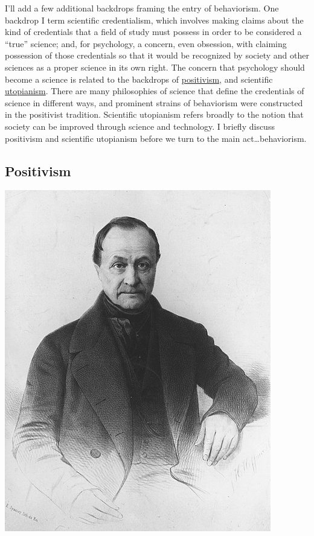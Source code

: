 \documentclass[
  oneside,
  12pt]{crumpbook}
\newenvironment{floatright25}{%
  \wrapfigure{R}{.25\textwidth}%
  }{%
  \endwrapfigure}
\begin{document}
I'll add a few additional backdrops framing the entry of behaviorism.
One backdrop I term scientific credentialism, which involves making claims about the kind of credentials that a field of study must possess in order to be considered a ``true'' science; and, for psychology, a concern, even obsession, with claiming possession of those credentials so that it would be recognized by society and other sciences as a proper science in its own right. The concern that psychology should become a science is related to the backdrops of \href{https://en.wikipedia.org/wiki/Positivism}{positivism}, and scientific \href{https://en.wikipedia.org/wiki/Utopia\#Utopianism}{utopianism}. There are many philosophies of science that define the credentials of science in different ways, and prominent strains of behaviorism were constructed in the positivist tradition. Scientific utopianism refers broadly to the notion that society can be improved through science and technology. I briefly discuss positivism and scientific utopianism before we turn to the main act\ldots behaviorism.

\hypertarget{positivism}{%
\subsection{Positivism}\label{positivism}}

\begin{floatright25}
\includegraphics[width=1\linewidth]{imgs/Auguste_Comte}

\end{floatright25}
\end{document}
